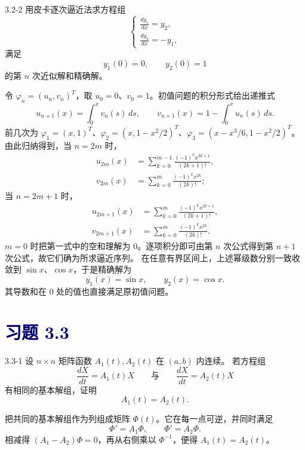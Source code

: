 \documentclass[UTF8,a4paper,11pt]{ctexart}
\newcommand{\sect}[1]{\section*{\textcolor{navy}{习题 #1}}}
\begin{document}
\begin{problem}{3.2-2}
用皮卡逐次逼近法求方程组
  \[
  \begin{cases}
    \displaystyle \frac{dy_1}{dx}=y_2,\\[5pt]
    \displaystyle \frac{dy_2}{dx}=-y_1,
  \end{cases}
  \]
  满足
  \[
    y_1(0)=0,\qquad y_2(0)=1
  \]
  的第 $n$ 次近似解和精确解。
\end{problem}

\begin{solution}
令 $\varphi_n=(u_n,v_n)^T$，取 $u_0=0$、$v_0=1$。初值问题的积分形式给出递推式
\[
u_{n+1}(x)=\int_0^xv_n(s)\,ds,\qquad
v_{n+1}(x)=1-\int_0^xu_n(s)\,ds.
\]
前几次为 $\varphi_1=(x,1)^T$、$\varphi_2=(x,1-x^2/2)^T$、$\varphi_3=(x-x^3/6,1-x^2/2)^T$。由此归纳得到，当 $n=2m$ 时，
\[
\boxed{\begin{aligned}
u_{2m}(x)&=\sum_{k=0}^{m-1}\frac{(-1)^kx^{2k+1}}{(2k+1)!},\\
v_{2m}(x)&=\sum_{k=0}^{m}\frac{(-1)^kx^{2k}}{(2k)!};
\end{aligned}}
\]
当 $n=2m+1$ 时，
\[
\boxed{\begin{aligned}
u_{2m+1}(x)&=\sum_{k=0}^{m}\frac{(-1)^kx^{2k+1}}{(2k+1)!},\\
v_{2m+1}(x)&=\sum_{k=0}^{m}\frac{(-1)^kx^{2k}}{(2k)!}.
\end{aligned}}
\]
$m=0$ 时把第一式中的空和理解为 $0$。逐项积分即可由第 $n$ 次公式得到第 $n+1$ 次公式，故它们确为所求逼近序列。
在任意有界区间上，上述幂级数分别一致收敛到 $\sin x$、$\cos x$，于是精确解为
\[\boxed{y_1(x)=\sin x,\qquad y_2(x)=\cos x}.\]
其导数和在 $0$ 处的值也直接满足原初值问题。
\end{solution}

\sect{3.3}
\begin{problem}{3.3-1}
设 $n\times n$ 矩阵函数 $A_1(t),A_2(t)$ 在 $(a,b)$ 内连续。
  若方程组
  \[
    \frac{dX}{dt}=A_1(t)X
    \qquad\text{与}\qquad
    \frac{dX}{dt}=A_2(t)X
  \]
  有相同的基本解组，证明
  \[
    A_1(t)=A_2(t).
  \]
\end{problem}

\begin{solution}
把共同的基本解组作为列组成矩阵 $\Phi(t)$。它在每一点可逆，并同时满足
\[
\Phi'=A_1\Phi,\qquad\Phi'=A_2\Phi.
\]
相减得 $(A_1-A_2)\Phi=0$，再从右侧乘以 $\Phi^{-1}$，便得 $\boxed{A_1(t)=A_2(t)}$。
\end{solution}
\end{document}
